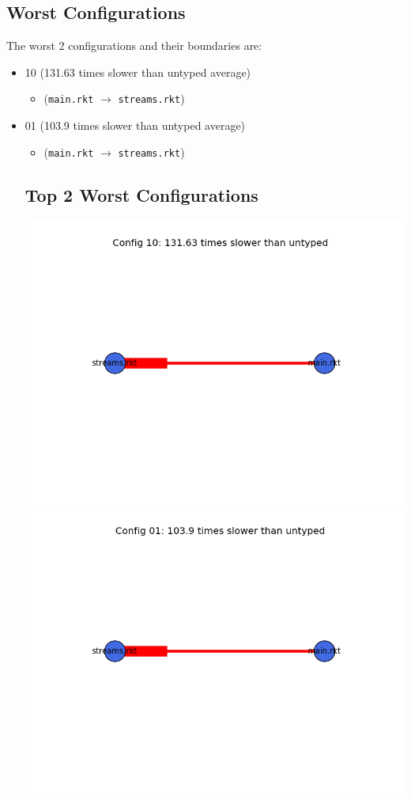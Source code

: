 \documentclass{article}
\newcommand{\mono}[1]{\texttt{#1}}
\begin{document}
\subsection{Worst Configurations}
The worst 2 configurations and their boundaries are:
\begin{itemize}
\item 10 (131.63 times slower than untyped average)
  \begin{itemize}
  \item (\mono{main.rkt} $\rightarrow$ \mono{streams.rkt})
  \end{itemize}
\item 01 (103.9 times slower than untyped average)
  \begin{itemize}
  \item (\mono{main.rkt} $\rightarrow$ \mono{streams.rkt})
  \end{itemize}

\subsection{Top 2 Worst Configurations}
\includegraphics[width=\textwidth]{sieve-2015-04-06-module-graph-10.png}
\includegraphics[width=\textwidth]{sieve-2015-04-06-module-graph-01.png}
\end{itemize}
\end{document}
